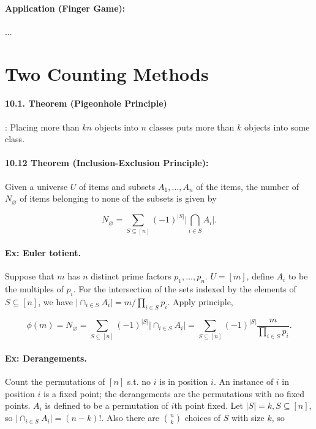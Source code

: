\documentclass[a4paper, 11pt, twoside]{article}
\begin{document}
\paragraph{Application (Finger Game):} ...

\section{Two Counting Methods}

\paragraph{10.1. Theorem (Pigeonhole Principle)}: Placing more than $kn$ objects into $n$ classes puts more than $k$ objects into some class.

\paragraph{10.12 Theorem (Inclusion-Exclusion Principle):} Given a universe $U$ of items and subsets $A_1, \dots, A_n$ of the items, the number of $N_{\varnothing}$ of items belonging to none of the subsets is given by

\[N_{\varnothing}=\sum_{S\subseteq [n]}(-1)^{|S|}\bigg|\bigcap_{i\in S}A_i\bigg|.\]

\paragraph{Ex: Euler totient.} Suppose that $m$ has $n$ distinct prime factors $p_1,\dots, p_n$. $U=[m]$, define $A_i$ to be the multiples of $p_i$. For the intersection of the sets indexed by the elements of $S\subseteq [n]$, we have $\big|\cap_{i\in S}A_i\big|=m/\prod_{i\in S}p_i$. Apply principle,

\[\phi(m)=N_{\varnothing}=\sum_{S\subseteq [n]}(-1)^{|S|}\bigg|\cap_{i\in S}A_i\bigg|=\sum_{S\subseteq [n]}(-1)^{|S|}\frac{m}{\prod_{i\in S}p_i}.\]

\paragraph{Ex: Derangements.} Count the permutations of $[n]$ s.t. no $i$ is in position $i$. An instance of $i$ in position $i$ is a fixed point; the derangements are the permutations with no fixed points. $A_i$ is defined to be a permutation of $i$th point fixed. Let $|S|=k, S\subseteq [n]$, so $\big|\cap_{i\in S}A_i\big|=(n-k)!$. Also there are ${n\choose k}$ choices of $S$ with size $k$, so
\end{document}
